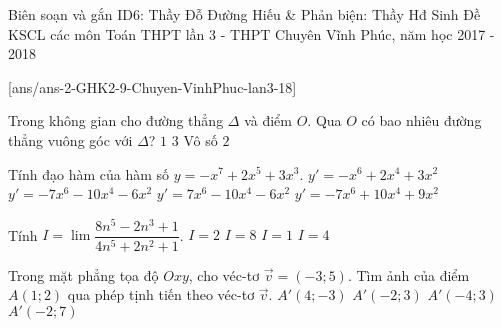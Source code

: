 \begin{name}
	{Biên soạn và gắn ID6: Thầy Đỗ Đường Hiếu \& Phản biện: Thầy Hđ Sinh}
	{Đề KSCL các môn Toán THPT lần 3 - THPT Chuyên Vĩnh Phúc, năm học 2017 - 2018}
\end{name}
\setcounter{ex}{0}\setcounter{bt}{0}
[ans/ans-2-GHK2-9-Chuyen-VinhPhuc-lan3-18]


\begin{ex}%
	Trong không gian cho đường thẳng $\Delta$ và điểm $O$. Qua $O$ có bao nhiêu đường thẳng vuông góc với $\Delta$?
	\choice
	{$1$}
	{$3$}
	{\True Vô số}
	{$2$}
\end{ex}

\begin{ex}%
	Tính đạo hàm của hàm số $ y=-x^7+2x^5+3x^3 $.
	\choice
	{$y'=-x^6+2x^4+3x^2$}
	{$y'=-7x^6-10x^4-6x^2$}
	{$y'=7x^6-10x^4-6x^2$}
	{\True $y'=-7x^6+10x^4+9x^2$}
\end{ex}


\begin{ex}%
	Tính $I= \lim \dfrac{8n^5-2n^3+1}{4n^5+2n^2+1} $.
	\choice
	{\True $I=2$}
	{$I=8$}
	{$I=1$}
	{$I=4$}
\end{ex}

\begin{ex}%
	Trong mặt phẳng tọa độ $ Oxy $, cho véc-tơ $ \overrightarrow{v}=(-3;5) $. Tìm ảnh của điểm $A(1;2)$ qua phép tịnh tiến theo véc-tơ $ \overrightarrow{v}$.
	\choice
	{$A'(4;-3)$}
	{$A'(-2;3)$}
	{$A'(-4;3)$}
	{\True $A'(-2;7)$}
\end{ex}


